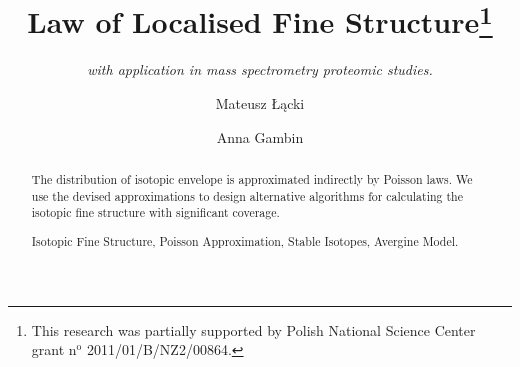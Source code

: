 \documentclass[runningheads,a4paper]{llncs}
\newcommand{\keywords}[1]{\par\addvspace\baselineskip
\noindent\keywordname\enspace\ignorespaces#1}
\begin{document}
\mainmatter  

\title{Law of Localised Fine Structure\thanks{
	This research was partially supported by Polish National Science Center grant $\text{n}^\text{o}$ 2011/01/B/NZ2/00864.
}}

\subtitle{\textit{with application in mass spectrometry proteomic studies.}}


\author{Mateusz \L\k{a}cki
\and Anna Gambin}





\maketitle

\begin{abstract}
  The distribution of isotopic envelope is approximated indirectly by Poisson laws. We use the devised approximations to design alternative algorithms for calculating the isotopic fine structure with significant coverage. 
\keywords{Isotopic Fine Structure, Poisson Approximation, Stable Isotopes, Avergine Model.}
\end{abstract}









  
  




\end{document}
